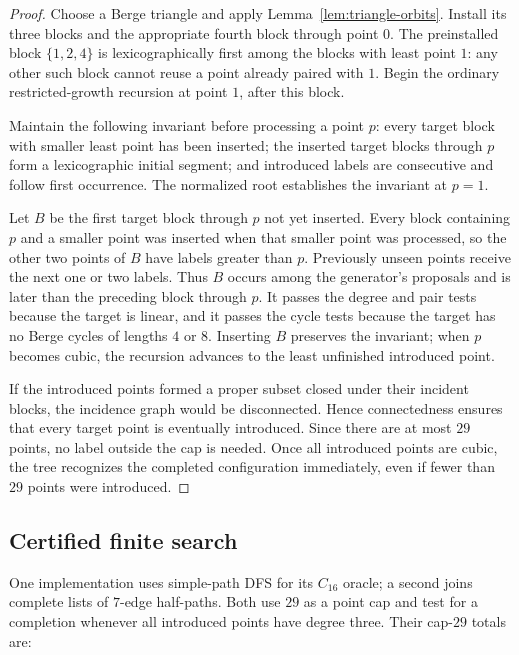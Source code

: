 \documentclass[11pt]{article}
\theoremstyle{definition}
\begin{document}
\begin{proof}
Choose a Berge triangle and apply Lemma~\ref{lem:triangle-orbits}. Install
its three blocks and the appropriate fourth block through point \(0\).
The preinstalled block \(\{1,2,4\}\) is lexicographically first among the
blocks with least point \(1\): any other such block cannot reuse a point
already paired with \(1\). Begin the ordinary restricted-growth recursion at
point \(1\), after this block.

Maintain the following invariant before processing a point \(p\): every
target block with smaller least point has been inserted; the inserted target
blocks through \(p\) form a lexicographic initial segment; and introduced
labels are consecutive and follow first occurrence. The normalized root
establishes the invariant at \(p=1\).

Let \(B\) be the first target block through \(p\) not yet inserted. Every
block containing \(p\) and a smaller point was inserted when that smaller
point was processed, so the other two points of \(B\) have labels greater
than \(p\). Previously unseen points receive the next one or two labels.
Thus \(B\) occurs among the generator's proposals and is later than the
preceding block through \(p\). It passes the degree and pair tests because
the target is linear, and it passes the cycle tests because the target has no
Berge cycles of lengths \(4\) or \(8\). Inserting \(B\) preserves the
invariant; when \(p\) becomes cubic, the recursion advances to the least
unfinished introduced point.

If the introduced points formed a proper subset closed under their incident
blocks, the incidence graph would be disconnected. Hence connectedness
ensures that every target point is eventually introduced. Since there are at
most \(29\) points, no label outside the cap is needed. Once all introduced
points are cubic, the tree recognizes the completed configuration
immediately, even if fewer than \(29\) points were introduced.
\end{proof}

\subsection{Certified finite search}

One implementation uses simple-path DFS for its \(C_{16}\) oracle; a second
joins complete lists of \(7\)-edge half-paths. Both use \(29\) as a point cap
and test for a completion whenever all introduced points have degree three.
Their cap-\(29\) totals are:
\end{document}
